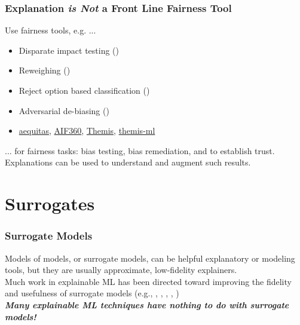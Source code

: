 \documentclass[11pt,
               aspectratio=169,
               hyperref={colorlinks}
               ]{beamer}
\begin{document}
	\begin{frame}[label={not_frontline}]
	
		\frametitle{Explanation \textbf{\textit{is Not}} a Front Line Fairness Tool}
		
		Use fairness tools, e.g. ...
		\vspace{5pt}
		\begin{itemize}\footnotesize
			\item Disparate impact testing (\citet{feldman2015certifying})
			\item Reweighing (\citet{kamiran2012data})
			\item Reject option based classification (\citet{kamiran2012decision})
			\item Adversarial de-biasing (\citet{zhang2018mitigating})
			\item \href{https://github.com/dssg/aequitas}{aequitas}, \href{https://github.com/IBM/AIF360}{AIF360}, \href{https://github.com/LASER-UMASS/Themis}{Themis}, \href{https://github.com/cosmicBboy/themis-ml}{themis-ml}
		\end{itemize}
		\vspace{5pt}
		... for fairness tasks: bias testing, bias remediation, and to establish trust.\\
		\vspace{10pt}
		Explanations can be used to understand and augment such results.
		
	\end{frame}
	
	\section{Surrogates}

	\begin{frame}
	
		\frametitle{Surrogate Models}
		
		Models of models, or surrogate models, can be helpful explanatory or modeling tools, but they are usually approximate, low-fidelity explainers.\\
		\vspace{10pt}
		Much work in explainable ML has been directed toward improving the fidelity and usefulness of surrogate models (e.g., \citet{dt_surrogate2}, \citet{viper}, \citet{dt_surrogate1}, \citet{lime-sup}, \citet{wf_xnn})\\
		\vspace{10pt}
		\textbf{\textit{Many explainable ML techniques have nothing to do with surrogate models!}}
		
	\end{frame}
	
\end{document}
